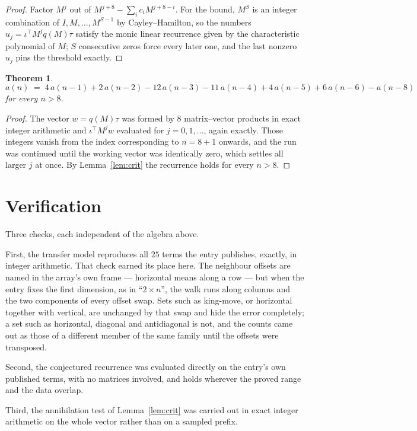 \documentclass[11pt,a4paper]{article}
\theoremstyle{plain}
\newtheorem{theorem}{Theorem}
\theoremstyle{definition}
\begin{document}
\begin{proof}
Factor $M^{j}$ out of $M^{j+8}-\sum_ic_iM^{j+8-i}$. For the bound, $M^{S}$
is an integer combination of $I,M,\dots,M^{S-1}$ by Cayley--Hamilton, so the numbers
$u_j=\iota^{\!\top}M^{j}q(M)\tau$ satisfy the monic linear recurrence given by the
characteristic polynomial of $M$; $S$ consecutive zeros force every later one, and the last
nonzero $u_j$ pins the threshold exactly.
\end{proof}

\begin{theorem}
\[
a(n)\;=\;4\,a(n-1) + 2\,a(n-2) - 12\,a(n-3) - 11\,a(n-4) + 4\,a(n-5) + 6\,a(n-6) - a(n-8)
\]
for every $n>8$.
\end{theorem}

\begin{proof}
The vector $w=q(M)\tau$ was formed by $8$ matrix--vector products in exact integer
arithmetic and $\iota^{\!\top}M^{j}w$ evaluated for $j=0,1,\dots$, again exactly. Those
integers vanish from the index corresponding to $n=8+1$ onwards, and the run was
continued until the working vector was identically zero, which settles all larger $j$ at once.
By Lemma~\ref{lem:crit} the recurrence holds for every $n>8$.
\end{proof}

\section{Verification}

Three checks, each independent of the algebra above.

First, the transfer model reproduces all $25$ terms the entry publishes, exactly, in
integer arithmetic. That check earned its place here. The neighbour offsets are named in the
array's own frame --- horizontal means along a row --- but when the entry fixes the first
dimension, as in ``$2\times n$'', the walk runs along columns and the two components of every
offset swap. Sets such as king-move, or horizontal together with vertical, are unchanged by
that swap and hide the error completely; a set such as horizontal, diagonal and antidiagonal
is not, and the counts came out as those of a different member of the same family until the
offsets were transposed.

Second, the conjectured recurrence was evaluated directly on the entry's own published terms,
with no matrices involved, and holds wherever the proved range and the data overlap.

Third, the annihilation test of Lemma~\ref{lem:crit} was carried out in exact integer
arithmetic on the whole vector rather than on a sampled prefix.
\end{document}
